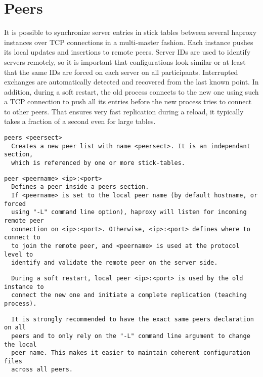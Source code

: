 
\section{Peers}

It is possible to synchronize server entries in stick tables between several
haproxy instances over TCP connections in a multi-master fashion. Each instance
pushes its local updates and insertions to remote peers. Server IDs are used to
identify servers remotely, so it is important that configurations look similar
or at least that the same IDs are forced on each server on all participants.
Interrupted exchanges are automatically detected and recovered from the last
known point. In addition, during a soft restart, the old process connects to
the new one using such a TCP connection to push all its entries before the new
process tries to connect to other peers. That ensures very fast replication
during a reload, it typically takes a fraction of a second even for large
tables.

\begin{verbatim}
peers <peersect>
  Creates a new peer list with name <peersect>. It is an independant section,
  which is referenced by one or more stick-tables.
\end{verbatim}

\begin{verbatim}
peer <peername> <ip>:<port>
  Defines a peer inside a peers section.
  If <peername> is set to the local peer name (by default hostname, or forced
  using "-L" command line option), haproxy will listen for incoming remote peer
  connection on <ip>:<port>. Otherwise, <ip>:<port> defines where to connect to
  to join the remote peer, and <peername> is used at the protocol level to
  identify and validate the remote peer on the server side.
\end{verbatim}

\begin{verbatim}
  During a soft restart, local peer <ip>:<port> is used by the old instance to
  connect the new one and initiate a complete replication (teaching process).
\end{verbatim}

\begin{verbatim}
  It is strongly recommended to have the exact same peers declaration on all
  peers and to only rely on the "-L" command line argument to change the local
  peer name. This makes it easier to maintain coherent configuration files
  across all peers.
\end{verbatim}


